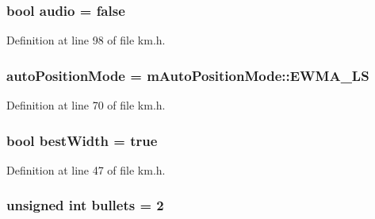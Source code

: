\subsubsection[{\texorpdfstring{audio}{audio}}]{\setlength{\rightskip}{0pt plus 5cm}bool audio = false}\hypertarget{struct_k_1_1m_quoting_params_ac76cbef55dea9f125b6f88259693e97a}{}\label{struct_k_1_1m_quoting_params_ac76cbef55dea9f125b6f88259693e97a}


Definition at line 98 of file km.\+h.

\subsubsection[{\texorpdfstring{auto\+Position\+Mode}{autoPositionMode}}]{ auto\+Position\+Mode = {\bf m\+Auto\+Position\+Mode\+::\+E\+W\+M\+A\+\_\+\+LS}}\hypertarget{struct_k_1_1m_quoting_params_a57aeb3184bd7e2fa299e62ddd0e64273}{}\label{struct_k_1_1m_quoting_params_a57aeb3184bd7e2fa299e62ddd0e64273}


Definition at line 70 of file km.\+h.

\subsubsection[{\texorpdfstring{best\+Width}{bestWidth}}]{\setlength{\rightskip}{0pt plus 5cm}bool best\+Width = true}\hypertarget{struct_k_1_1m_quoting_params_a7e744b13bec19c083103e7ae84845427}{}\label{struct_k_1_1m_quoting_params_a7e744b13bec19c083103e7ae84845427}


Definition at line 47 of file km.\+h.

\subsubsection[{\texorpdfstring{bullets}{bullets}}]{\setlength{\rightskip}{0pt plus 5cm}unsigned int bullets = 2}\hypertarget{struct_k_1_1m_quoting_params_a66918388a988312b129d487b71d79136}{}\label{struct_k_1_1m_quoting_params_a66918388a988312b129d487b71d79136}


